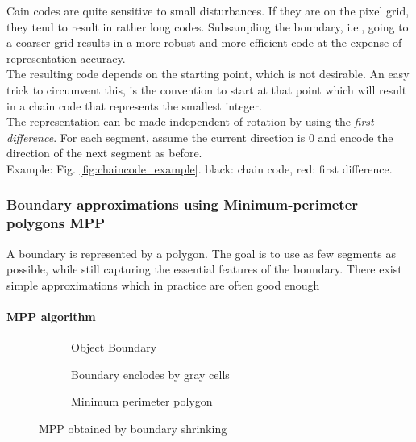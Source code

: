 Cain codes are quite sensitive to small disturbances. If they are on the pixel grid, they tend to result in rather long codes. Subsampling the boundary, i.e., going to a coarser grid results in a more robust and more efficient code at the expense of representation accuracy.\\
The resulting code depends on the starting point, which is not desirable. An easy trick to circumvent this, is the convention to start at that point which will result in a chain code that represents the smallest integer.\\

The representation can be made independent of rotation by using the \emph{first difference}.
For each segment, assume the current direction is 0 and encode the direction of the next segment as before. \\
Example: Fig. \ref{fig:chaincode_example}. black: chain code, red: first difference.

\subsubsection{Boundary approximations using Minimum-perimeter polygons MPP}
A boundary is represented by a polygon. The goal is to use as few segments as possible, while still capturing the essential features of the boundary. There exist simple approximations which in practice are often good enough\\
\paragraph{MPP algorithm}
\begin{figure}[h]
	\centering
	\begin{subfigure}[b]{0.3\textwidth}
		\centering
		\caption{Object Boundary}
	\end{subfigure}
	\begin{subfigure}[b]{0.3\textwidth}
		\centering
		\caption{Boundary enclodes by gray cells}
	\end{subfigure}
	\begin{subfigure}[b]{0.3\textwidth}
		\centering
		\caption{Minimum perimeter polygon}
	\end{subfigure}
	\caption{MPP obtained by boundary shrinking}
\end{figure}

